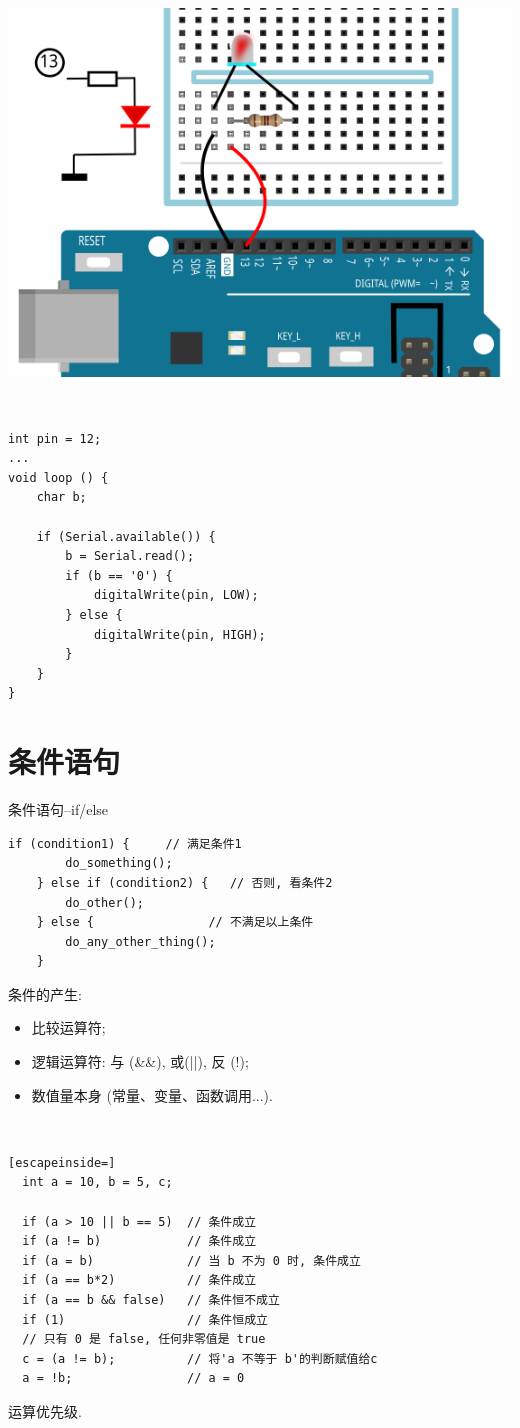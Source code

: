 \documentclass[a4paper,11pt]{seminar}
\begin{document}
\endslide

%

\centering
\includegraphics[width=.8\textwidth]{LED1}
\endslide


~\ \vskip-6mm
\begin{lstlisting}
int pin = 12;
...
void loop () {
    char b;

    if (Serial.available()) {
        b = Serial.read();
        if (b == '0') {
            digitalWrite(pin, LOW);
        } else {
            digitalWrite(pin, HIGH);
        }
    }
}
\end{lstlisting}
\endslide

\chapter{条件语句}{条件语句--if/else}
~\ \vskip-6mm
\begin{lstlisting}[emph={do_something,do_other,do_any_other_thing}]
    if (condition1) {     // 满足条件1
        do_something();
    } else if (condition2) {   // 否则, 看条件2
        do_other();
    } else {                // 不满足以上条件
        do_any_other_thing();
    }
\end{lstlisting}
条件的产生:
\begin{itemize}
    \item 比较运算符;
    \item 逻辑运算符: 与 (\&\&),  或(||), 反 (!);
    \item 数值量本身 (常量、变量、函数调用...).
\end{itemize}
\endslide


~\ \vskip-6mm
\begin{lstlisting}[escapeinside=]
  int a = 10, b = 5, c;

  if (a > 10 || b == 5)  // 条件成立
  if (a != b)            // 条件成立
  if (a = b)             // 当 b 不为 0 时, 条件成立
  if (a == b*2)          // 条件成立
  if (a == b && false)   // 条件恒不成立
  if (1)                 // 条件恒成立
  // 只有 0 是 false, 任何非零值是 true
  c = (a != b);          // 将'a 不等于 b'的判断赋值给c
  a = !b;                // a = 0
\end{lstlisting}
运算优先级.
\end{document}
